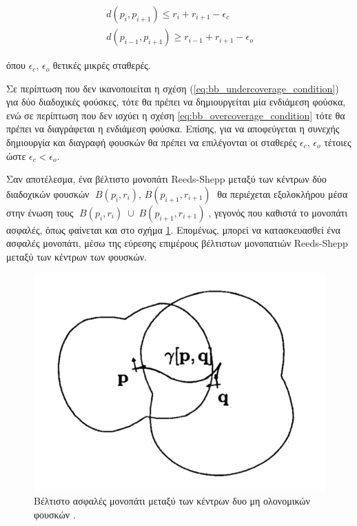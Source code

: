 \begin{align}
	d(p_{i}, p_{i+1}) \leq r_i + r_{i+1} - \epsilon_c
	\label{eq:bb_undercoverage_condition} \\[0.5cm]
	d(p_{i-1}, p_{i+1}) \geq r_{i-1} + r_{i+1} - \epsilon_o
	\label{eq:bb_overcoverage_condition}
\end{align}

\noindent όπου $\epsilon_c$, $\epsilon_o$ θετικές μικρές σταθερές.

\bigskip
Σε περίπτωση που δεν ικανοποιείται η σχέση (\ref{eq:bb_undercoverage_condition}) για δύο διαδοχικές φούσκες, τότε θα πρέπει να δημιουργείται μία ενδιάμεση φούσκα, ενώ σε περίπτωση που δεν ισχύει η σχέση \ref{eq:bb_overcoverage_condition} τότε θα πρέπει να διαγράφεται η ενδιάμεση φούσκα. Επίσης, για να αποφεύγεται η συνεχής δημιουργία και διαγραφή φουσκών θα πρέπει να επιλέγονται οι σταθερές $\epsilon_c$, $\epsilon_o$ τέτοιες ώστε $\epsilon_c < \epsilon_o$.

\bigskip
Σαν αποτέλεσμα, ένα βέλτιστο μονοπάτι Reeds-Shepp μεταξύ των κέντρων δύο διαδοχικών φουσκών $\;B(p_i,r_i)$, $B(p_{i+1},r_{i+1})\;$ θα περιέχεται εξολοκλήρου μέσα στην ένωση τους $\;B(p_i,r_i) \;\cup\; B(p_{i+1},r_{i+1})\;$, γεγονός που καθιστά το μονοπάτι ασφαλές, όπως φαίνεται και στο σχήμα \ref{fig:bubble_band_path}. Επομένως, μπορεί να κατασκευασθεί ένα ασφαλές μονοπάτι, μέσω της εύρεσης επιμέρους βέλτιστων μονοπατιών Reeds-Shepp μεταξύ των κέντρων των φουσκών.

\begin{figure}[!ht]
	\centering
	\includegraphics[width=0.4\linewidth]{Chapters/Chapter3/Figures/bubble_band_path.png}
	\caption[Βέλτιστο ασφαλές μονοπάτι μεταξύ των κέντρων δυο μη ολονομικών φουσκών.]{Βέλτιστο ασφαλές μονοπάτι μεταξύ των κέντρων δυο μη ολονομικών φουσκών \cite{dpm}.}
	\label{fig:bubble_band_path}
\end{figure}

